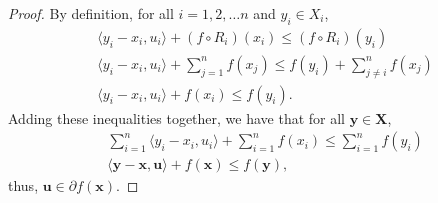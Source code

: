 \documentclass[11pt]{article}
\newcommand\inner[2]{\langle #1, #2 \rangle}
\begin{document}
		 \begin{proof}
			By definition, for all $i=1,2,\ldots n$ and $y_i\in X_i$,
			\begin{align*}
				& \inner{y_i - x_i}{u_i} + (f\circ R_i)(x_i)\leq (f\circ R_i)(y_i)\\
				& \inner{y_i - x_i}{u_i} + \sum_{j=1}^{n}f(x_j) \leq f(y_i) + \sum_{j\neq i}^{n}f(x_j) \\
				& \inner{y_i - x_i}{u_i} + f(x_i) \leq f(y_i).
			\end{align*}
			Adding these inequalities together, we have that for all $\bm{y}\in\bm{X}$, 
			\begin{align*}
				& \sum_{i=1}^{n}\inner{y_i - x_i}{u_i} + \sum_{i=1}^{n}f(x_i) \leq \sum_{i=1}^{n}f(y_i) \\
				& \inner{\bm{y} - \bm{x}}{\bm{u}} + f(\bm{x}) \leq f(\bm{y}),
			\end{align*}
			thus, $\bm{u}\in \partial f(\bm{x})$.
		\end{proof}
\end{document}

